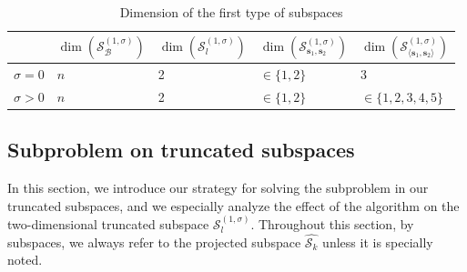 \documentclass[colorlinks=true, linkcolor=blue, citecolor=blue, urlcolor=blue]{article}
\theoremstyle{plain}
\theoremstyle{definition}
\theoremstyle{remark}
\begin{document}
\begin{table}[htbp]%
    \centering
    \caption{Dimension of the first type of subspaces}
    \centering
    \begin{tabular}{m{1cm}<{\centering}m{2cm}
    <{\centering}m{2cm}
    <{\centering}m{2cm}<{\centering}m{2.2cm}<{\centering}}
    \toprule
     & $\dim (\mathcal{S}_{\mathcal{B}}^{(1,\sigma)})$ & $\dim (\mathcal{S}_{l}^{(1,\sigma)})$ & $\dim (\mathcal{S}_{\bm s_1,\bm s_2}^{(1,\sigma)})$ & $\dim (\mathcal{S}_{\langle\bm s_1,\bm s_2\rangle}^{(1,\sigma)})$
     \\
    \midrule
        $\sigma=0$  & $n$ & 2 & $\in\{1,2\}$ & 3  \\
        
         

        $\sigma>0$ & $n$ & 2 & $\in\{1,2\}$ & $\in\{1,2,3,4,5\}$ \\
        
    \bottomrule

    \end{tabular}   
    \label{tab:dim of subspaces}
\end{table}

\subsection{Subproblem on truncated subspaces}\label{section: Trust region subproblem on subspace}



In this section, we introduce our strategy for solving the subproblem in our truncated subspaces, and we especially analyze the effect of the algorithm on the two-dimensional truncated subspace
$\mathcal{S}_l^{(1,\sigma)}$. Throughout this section, by subspaces, we always refer to the projected subspace $\hat{\mathcal{S}_k}$ unless it is specially noted.
\end{document}
